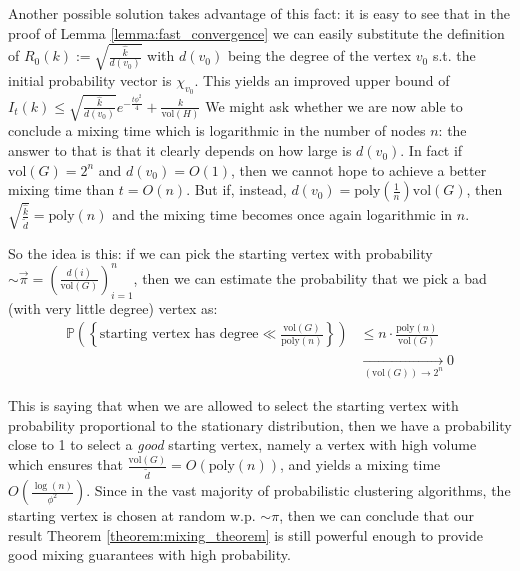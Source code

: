 \documentclass[../main.tex]{subfiles}
\begin{document}
Another possible solution takes advantage of this fact: it is easy to see that in the proof of Lemma \ref{lemma:fast_convergence} we can easily substitute the definition of $R_0(k):= \sqrt{\frac{\hat{k}}{d(v_0)}}$ with $d(v_0)$ being the degree of the vertex $v_0$ s.t. the initial probability vector is $\chi_{v_0}$. This yields an improved upper bound of $I_t(k) \leq \sqrt{\frac{\hat{k}}{d(v_0)}}e^{-\frac{t \phi^2}{4}} + \frac{k}{\text{vol}(H)}$
We might ask whether we are now able to conclude a mixing time which is logarithmic in the number of nodes $n$: the answer to that is that it clearly depends on how large is $d(v_0)$. In fact if $\text{vol}(G) = 2^n$ and $d(v_0) = O(1)$, then we cannot hope to achieve a better mixing time than $t=O(n)$. But if, instead, $d(v_0) = \text{poly}\left(\frac{1}{n}\right)\text{vol}(G)$, then $\sqrt{\frac{\hat{k}}{\tilde{d}}} = \text{poly}(n)$ and the mixing time becomes once again logarithmic in $n$. 

So the idea is this: if we can pick the starting vertex with probability $\sim \vec{\pi} = \left(\frac{d(i)}{\text{vol}(G)}\right)_{i=1}^{n}$, then we can estimate the probability that we pick a bad (with very little degree) vertex as: 
\begin{align}
    \mathbb{P}\left(\left\{\text{starting vertex has degree} \ll \frac{\text{vol}(G)}{\text{poly}(n)}\right\}\right) & \leq 
    n \cdot \frac{\text{poly}(n)}{\text{vol}(G)} \\ & \xrightarrow[(\text{vol}(G))\to 2^n]{} 0
\end{align}

This is saying that when we are allowed to select the starting vertex with probability proportional to the stationary distribution, then we have a probability close to 1 to select a \textit{good} starting vertex, namely a vertex with high volume which ensures that $\frac{\text{vol}(G)}{\tilde{d}} = O(\text{poly}(n))$, and yields a mixing time $O\left(\frac{\log(n)}{\phi^2}\right)$. Since in the vast majority of probabilistic clustering algorithms, the starting vertex is chosen at random w.p. $\sim \pi$, then we can conclude that our result Theorem \ref{theorem:mixing_theorem} is still powerful enough to provide good mixing guarantees with high probability.
\end{document}
